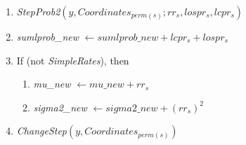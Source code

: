\documentclass[a4paper,12pt,fleqn]{article}
\begin{document}
\begin{enumerate}[resume]
\begin{enumerate}
      \item \textit{StepProb2}$(y, \textit{Coordinates}_{\textit{perm}(s)};
                                            rr_s, lospr_s, lcpr_s)$
      \item
        \textit{sumlprob\_new} $ \leftarrow \textit{sumlprob\_new} + lcpr_s + lospr_s $
      \item If (not \textit{SimpleRates}), then
         \begin{enumerate}
          \item \textit{mu\_new} $ \leftarrow  \textit{mu\_new} + rr_s  $
          \item \textit{sigma2\_new} $ \leftarrow \textit{sigma2\_new}  + (rr_s)^2 $
         \end{enumerate}
      \item \textit{ChangeStep}$(y, \textit{Coordinates}_{\textit{perm}(s)})$
      \end{enumerate}


\end{enumerate}
\end{document}
